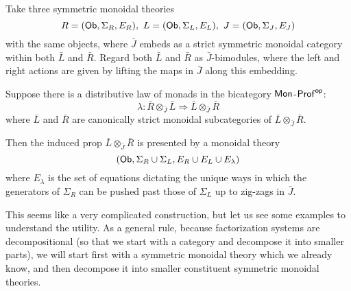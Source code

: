 %
%
%
%
%
%
%
%
%
\begin{lemma}
Take three symmetric monoidal theories
$$
R=({\sf Ob},\Sigma_R ,E_R ), \ L=({\sf Ob},\Sigma_L ,E_L ),  \ J=({\sf Ob},\Sigma_J ,E_J )
$$
with the same objects, where $\bar{J}$ embeds as a strict symmetric monoidal category within both $\bar{L}$ and $\bar{R}$.  Regard both $\bar{L}$ and $\bar{R}$ as  $\bar{J}$-bimodules, where the left and right actions are given by lifting the maps in $\bar{J}$ along this embedding.

Suppose there is a distributive law of monads in the bicategory ${\sf Mon}$-${\sf Prof}^{\mathsf{op}}$:
$$
\lambda:\bar{R}\otimes_{\bar{J}} \bar{L}\Rightarrow \bar{L}\otimes_{\bar{J}} \bar{R}
$$
where $\bar{L}$ and $\bar{R}$ are canonically strict monoidal subcategories of $\bar{L}\otimes_{\bar{J}} \bar{R}$.

Then the induced prop $\bar{L}\otimes_{\bar{J}} \bar{R}$ is presented by a monoidal theory
$$
({\sf Ob}, \Sigma_R\cup \Sigma_L, E_R\cup E_L \cup E_\lambda)
$$
where $E_\lambda$ is the set of equations dictating the unique ways in which the generators of $\Sigma_R$ can be pushed past those of $\Sigma_L$ up to zig-zags in $\bar{J}$.
\end{lemma}
This seems like a very complicated construction, but let us see some examples to understand the utility.  As a general rule, because factorization systems are decompositional (so that we start with a category and decompose it into smaller parts), we will start first with a symmetric monoidal theory which we already know, and then decompose it into smaller constituent symmetric monoidal theories.
